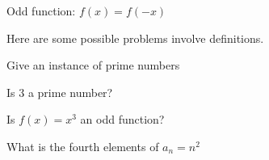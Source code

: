 \begin{example}
  Odd function: $f(x) = f(-x)$
\end{example}

Here are some possible problems involve definitions.

\begin{example}
  Give an instance of prime numbers
\end{example}

\begin{example}
  Is 3 a prime number?
\end{example}

\begin{example}
  Is $f(x) = x^3$ an odd function?
\end{example}

\begin{example}
  What is the fourth elements of $a_n = n^2$
\end{example}

